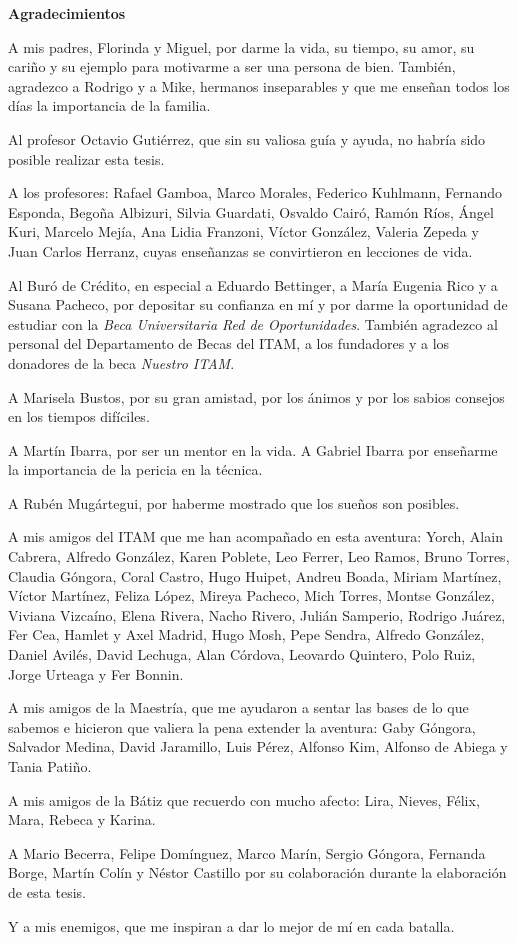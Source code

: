 \begin{center}
{\huge \bfseries Agradecimientos\\}
\end{center}

A mis padres, Florinda y Miguel, por darme la vida, su tiempo, su amor, su cariño y su ejemplo para motivarme a ser una persona de bien. También, agradezco a Rodrigo y a Mike, hermanos inseparables y que me enseñan todos los días la importancia de la familia.

Al profesor Octavio Gutiérrez, que sin su valiosa guía y ayuda, no habría sido posible realizar esta tesis.

A los profesores: Rafael Gamboa, Marco Morales, Federico Kuhlmann, Fernando Esponda, Begoña Albizuri, Silvia Guardati, Osvaldo Cairó, Ramón Ríos, Ángel Kuri, Marcelo Mejía, Ana Lidia Franzoni, Víctor González, Valeria Zepeda y Juan Carlos Herranz, cuyas enseñanzas se convirtieron en lecciones de vida.

Al Buró de Crédito, en especial a Eduardo Bettinger, a María Eugenia Rico y a Susana Pacheco, por depositar su confianza en mí y por darme la oportunidad de estudiar con la \emph{Beca Universitaria Red de Oportunidades}. También agradezco al personal del Departamento de Becas del ITAM, a los fundadores y a los donadores de la beca \emph{Nuestro ITAM}.

A Marisela Bustos, por su gran amistad, por los ánimos y por los sabios consejos en los tiempos difíciles.

A Martín Ibarra, por ser un mentor en la vida. A Gabriel Ibarra por enseñarme la importancia de la pericia en la técnica.

A Rubén Mugártegui, por haberme mostrado que los sueños son posibles.

A mis amigos del ITAM que me han acompañado en esta aventura: Yorch, Alain Cabrera, Alfredo González, Karen Poblete, Leo Ferrer, Leo Ramos, Bruno Torres, Claudia Góngora, Coral Castro, Hugo Huipet, Andreu Boada, Miriam Martínez, Víctor Martínez, Feliza López, Mireya Pacheco, Mich Torres, Montse González, Viviana Vizcaíno, Elena Rivera, Nacho Rivero, Julián Samperio, Rodrigo Juárez, Fer Cea, Hamlet y Axel Madrid, Hugo Mosh, Pepe Sendra, Alfredo González, Daniel Avilés, David Lechuga, Alan Córdova, Leovardo Quintero, Polo Ruiz, Jorge Urteaga y Fer Bonnin.

A mis amigos de la Maestría, que me ayudaron a sentar las bases de lo que sabemos e hicieron que valiera la pena extender la aventura: Gaby Góngora, Salvador Medina, David Jaramillo, Luis Pérez, Alfonso Kim, Alfonso de Abiega y Tania Patiño.

A mis amigos de la Bátiz que recuerdo con mucho afecto: Lira, Nieves, Félix, Mara, Rebeca y Karina.

A Mario Becerra, Felipe Domínguez, Marco Marín, Sergio Góngora, Fernanda Borge, Martín Colín y Néstor Castillo por su colaboración durante la elaboración de esta tesis.

Y a mis enemigos, que me inspiran a dar lo mejor de mí en cada batalla.
\clearpage